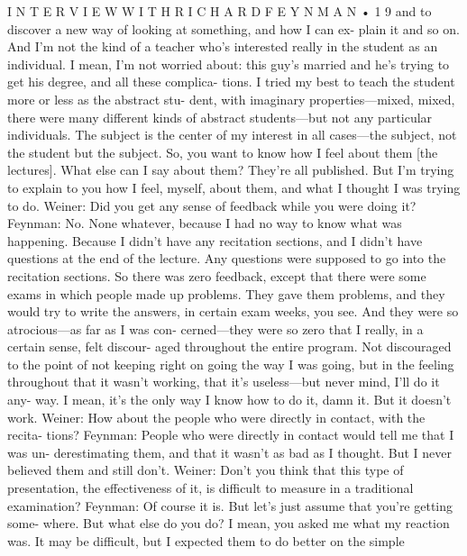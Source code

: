 \documentclass[11pt,oneside]{article}
\begin{document}
I N T E R V I E W  W I T H  R I C H A R D  F E Y N M A N • 1 9 and to discover a new way of looking at something, and how I can ex- plain it and so on. And I’m not the kind of a teacher who’s interested really in the student as an individual. I mean, I’m not worried about: this guy’s married and he’s trying to get his degree, and all these complica- tions. I tried my best to teach the student more or less as the abstract stu- dent, with imaginary properties---mixed, mixed, there were many different kinds of abstract students---but not any particular individuals. The subject is the center of my interest in all cases---the subject, not the student but the subject. So, you want to know how I feel about them [the lectures]. What else can I say about them? They’re all published. But I’m trying to explain to you how I feel, myself, about them, and what I thought I was trying to do. Weiner: Did you get any sense of feedback while you were doing it? Feynman: No. None whatever, because I had no way to know what was happening. Because I didn’t have any recitation sections, and I didn’t have questions at the end of the lecture. Any questions were supposed to go into the recitation sections. So there was zero feedback, except that there were some exams in which people made up problems. They gave them problems, and they would try to write the answers, in certain exam weeks, you see. And they were so atrocious---as far as I was con- cerned---they were so zero that I really, in a certain sense, felt discour- aged throughout the entire program. Not discouraged to the point of not keeping right on going the way I was going, but in the feeling throughout that it wasn’t working, that it’s useless---but never mind, I’ll do it any- way. I mean, it’s the only way I know how to do it, damn it. But it doesn’t work. Weiner: How about the people who were directly in contact, with the recita- tions? Feynman: People who were directly in contact would tell me that I was un- derestimating them, and that it wasn’t as bad as I thought. But I never believed them and still don’t. Weiner: Don’t you think that this type of presentation, the effectiveness of it, is difficult to measure in a traditional examination? Feynman: Of course it is. But let’s just assume that you’re getting some- where. But what else do you do? I mean, you asked me what my reaction was. It may be difficult, but I expected them to do better on the simple\par
\end{document}
